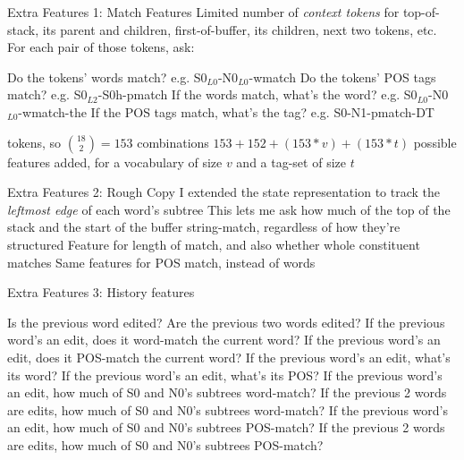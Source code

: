 \documentclass{lecture}
\begin{document}
\begin{points}{Extra Features 1: Match Features}
\p Limited number of \emph{context tokens} for top-of-stack,
    its parent and children, first-of-buffer, its children, next two tokens, etc.
\p For each pair of those tokens, ask:\\
\begin{itemize}
        \p Do the tokens' words match? e.g. S0$_{L0}$-N0$_{L0}$-wmatch
        \p Do the tokens' POS tags match? e.g. S0$_{L2}$-S0h-pmatch
        \p If the words match, what's the word? e.g. S0$_{L0}$-N0$_{L0}$-wmatch-the
        \p If the POS tags match, what's the tag? e.g. S0-N1-pmatch-DT
\end{itemize}
 tokens, so ${18 \choose 2} = 153$ combinations
\p $153 + 152 + (153 * v) + (153 * t)$ possible features added, for a vocabulary
   of size $v$ and a tag-set of size $t$
\end{points}

\begin{points}{Extra Features 2: Rough Copy}
    \p I extended the state representation to track the \emph{leftmost edge} of
       each word's subtree
    \p This lets me ask how much of the top of the stack and the start of the buffer
       string-match, regardless of how they're structured
    \p Feature for length of match, and also whether whole constituent matches
    \p Same features for POS match, instead of words
\end{points}

\begin{points}{Extra Features 3: History features}

\p Is the previous word edited?
\p Are the previous two words edited?
\p If the previous word's an edit, does it word-match the current word?
\p If the previous word's an edit, does it POS-match the current word?
\p If the previous word's an edit, what's its word?
\p If the previous word's an edit, what's its POS?
\p If the previous word's an edit, how much of S0  and N0's subtrees word-match?
\p If the previous 2 words are edits, how much of S0  and N0's subtrees word-match?
\p If the previous word's an edit, how much of S0  and N0's subtrees POS-match?
\p If the previous 2 words are edits, how much of S0  and N0's subtrees POS-match?

\end{points}
\end{document}
